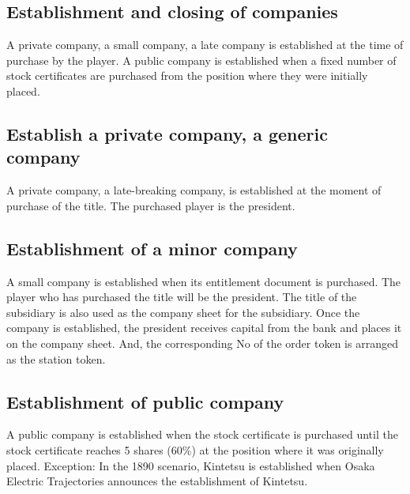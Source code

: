 \documentclass{article}
\begin{document}
\begin{CJK}{UTF8}{min}


\section{Establishment and closing of companies}
A private company, a small company, a late company is established at
the time of purchase by the player. A public company is established
when a fixed number of stock certificates are purchased from the
position where they were initially placed.

\subsection{Establish a private company, a generic company}
A private company, a late-breaking company, is established at the
moment of purchase of the title. The purchased player is the
president.

\subsection{Establishment of a minor company}
A small company is established when its entitlement document is
purchased. The player who has purchased the title will be the
president. The title of the subsidiary is also used as the company
sheet for the subsidiary. Once the company is established, the
president receives capital from the bank and places it on the company
sheet. And, the corresponding No of the order token is arranged as the
station token.

\subsection{Establishment of public company}
A public company is established when the stock certificate is
purchased until the stock certificate reaches 5 shares (60\%) at the
position where it was originally placed. Exception: In the 1890
scenario, Kintetsu is established when Osaka Electric Trajectories
announces the establishment of Kintetsu.


\end{CJK}
\end{document}
